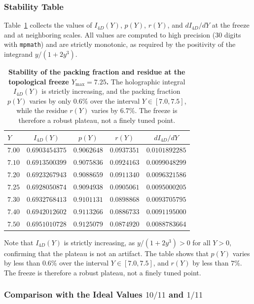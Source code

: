 \documentclass[a4paper,1pt,oneside,openany]{book}
\begin{document}
\subsubsection{Stability Table}

Table~\ref{tab:packing-stability} collects the values of $I_{4D}(Y)$, $p(Y)$, $r(Y)$, and $dI_{4D}/dY$ at the freeze and at neighboring scales. All values are computed to high precision (30 digits with \texttt{mpmath}) and are strictly monotonic, as required by the positivity of the integrand $y/(1+2y^3)$.

\begin{table}[h]
\centering
\caption{\textbf{Stability of the packing fraction and residue at the topological freeze $Y_{\max} = 7.25$.} The holographic integral $I_{4D}(Y)$ is strictly increasing, and the packing fraction $p(Y)$ varies by only $0.6\%$ over the interval $Y \in [7.0, 7.5]$, while the residue $r(Y)$ varies by $6.7\%$. The freeze is therefore a robust plateau, not a finely tuned point.}
\label{tab:packing-stability}
\small
\begin{tabular}{@{}lcccc@{}}
\toprule
$Y$ & $I_{4D}(Y)$ & $p(Y)$ & $r(Y)$ & $dI_{4D}/dY$ \\
\midrule
$7.00$ & $0.6903454375$ & $0.9062648$ & $0.0937351$ & $0.0101892285$ \\
$7.10$ & $0.6913500399$ & $0.9075836$ & $0.0924163$ & $0.0099048299$ \\
$7.20$ & $0.6923267943$ & $0.9088659$ & $0.0911340$ & $0.0096321586$ \\
$\mathbf{7.25}$ & $\mathbf{0.6928050874}$ & $\mathbf{0.9094938}$ & $\mathbf{0.0905061}$ & $\mathbf{0.0095000205}$ \\
$7.30$ & $0.6932768413$ & $0.9101131$ & $0.0898868$ & $0.0093705795$ \\
$7.40$ & $0.6942012602$ & $0.9113266$ & $0.0886733$ & $0.0091195000$ \\
$7.50$ & $0.6951010728$ & $0.9125079$ & $0.0874920$ & $0.0088783664$ \\
\bottomrule
\end{tabular}
\end{table}

Note that $I_{4D}(Y)$ is strictly increasing, as $y/(1+2y^3) > 0$ for all $Y > 0$, confirming that the plateau is not an artifact. The table shows that $p(Y)$ varies by less than $0.6\%$ over the interval $Y \in [7.0, 7.5]$, and $r(Y)$ by less than $7\%$. The freeze is therefore a robust plateau, not a finely tuned point.

\subsubsection{Comparison with the Ideal Values $10/11$ and $1/11$}
\end{document}
